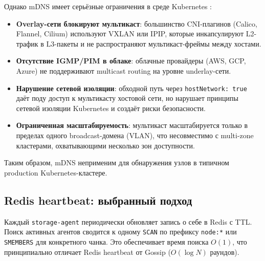 Однако mDNS имеет серьёзные ограничения в среде Kubernetes \cite{mdns_k8s_limitations}:
\begin{itemize}[leftmargin=*]
  \item \textbf{Overlay-сети блокируют мультикаст}: большинство CNI-плагинов (Calico, Flannel, Cilium) используют VXLAN или IPIP, которые инкапсулируют L2-трафик в L3-пакеты и не распространяют мультикаст-фреймы между хостами.
  \item \textbf{Отсутствие IGMP/PIM в облаке}: облачные провайдеры (AWS, GCP, Azure) не поддерживают multicast routing на уровне underlay-сети.
  \item \textbf{Нарушение сетевой изоляции}: обходной путь через \texttt{hostNetwork: true} даёт поду доступ к мультикасту хостовой сети, но нарушает принципы сетевой изоляции Kubernetes и создаёт риски безопасности.
  \item \textbf{Ограниченная масштабируемость}: мультикаст масштабируется только в пределах одного broadcast-домена (VLAN), что несовместимо с multi-zone кластерами, охватывающими несколько зон доступности.
\end{itemize}

Таким образом, mDNS неприменим для обнаружения узлов в типичном production Kubernetes-кластере.

\subsection*{Redis heartbeat: выбранный подход}

Каждый \texttt{storage-agent} периодически обновляет запись о себе в Redis с TTL. Поиск активных агентов сводится к одному \texttt{SCAN} по префиксу \texttt{node:*} или \texttt{SMEMBERS} для конкретного чанка. Это обеспечивает время поиска $O(1)$, что принципиально отличает Redis heartbeat от Gossip ($O(\log N)$ раундов).

